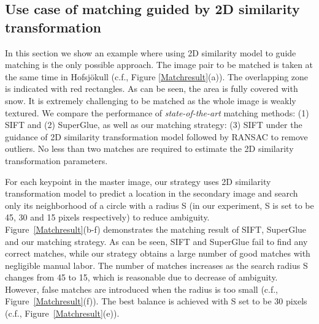 \subsection{Use case of matching guided by 2D similarity transformation}
\label{inputHomography}
In this section we show an example where using 2D similarity model to guide matching is the only possible approach. 
The image pair to be matched is taken at the same time in Hofsjökull (c.f., Figure \ref{Matchresult}(a)). The overlapping zone is indicated with red rectangles. As can be seen, the area is fully covered with snow. It is extremely challenging to be matched as the whole image is weakly textured.  
We compare the performance of \textit{state-of-the-art} matching methods: (1) SIFT and (2) SuperGlue, as well as our matching strategy: (3) SIFT under the guidance of 2D similarity transformation model followed by RANSAC to remove outliers. 
No less than two matches are required to estimate the 2D similarity transformation parameters. 
\par
For each keypoint in the master image, our strategy uses 2D similarity transformation model to predict a location in the secondary image and search only its neighborhood of a circle with a radius S (in our experiment, S is set to be 45, 30 and 15 pixels respectively) to reduce ambiguity.\\
Figure~\ref{Matchresult}(b-f) demonstrates the matching result of SIFT, SuperGlue and our matching strategy. As can be seen, SIFT and SuperGlue fail to find any correct matches, while our strategy obtains a large number of good matches with negligible manual labor. The number of matches increases as the search radius S changes from 45 to 15, which is reasonable due to decrease of ambiguity. However, false matches are introduced when the radius is too small (c.f., Figure~\ref{Matchresult}(f)). The best balance is achieved with S set to be 30 pixels (c.f., Figure~\ref{Matchresult}(e)).\\
